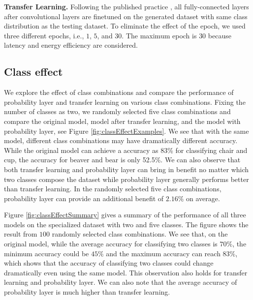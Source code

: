 \documentclass[pageno]{jpaper}
\begin{document}
\textbf{Transfer Learning.} Following the published practice \cite{doersch2015unsupervised, han2016mcdnn, oquab2014learning, shen2016fast, yosinski2014transferable}, all fully-connected layers after convolutional layers are finetuned on the generated dataset with same class distribution as the testing dataset. To eliminate the effect of the epoch, we used three different epochs, i.e., $1$, $5$, and $30$. The maximum epoch is $30$ because latency and energy efficiency are considered.

\subsection{Class effect}
We explore the effect of class combinations and compare the performance of probability layer and transfer learning on various class combinations. Fixing the number of classes as two, we randomly selected five class combinations and compare the original model, model after transfer learning, and the model with probability layer, see Figure \ref{fig:classEffectExamples}. We see that with the same model, different class combinations may have dramatically different accuracy. While the original model can achieve a accuracy as 83\% for classifying chair and cup, the accuracy for beaver and bear is only 52.5\%. We can also observe that both transfer learning and probability layer can bring in benefit no matter which two classes compose the dataset while probability layer generally performs better than transfer learning. In the randomly selected five class combinations, probability layer can provide an additional benefit of $2.16\%$ on average.

Figure \ref{fig:classEffectSummary} gives a summary of the performance of all three models on the specialized dataset with two and five classes. The figure shows the result from $100$ randomly selected class combinations. We see that, on the original model, while the average accuracy for classifying two classes is $70\%$, the minimum accuracy could be $45\%$ and the maximum accuracy can reach $83\%$, which shows that the accuracy of classifying two classes could change dramatically even using the same model. This observation also holds for transfer learning and probability layer. We can also note that the average accuracy of probability layer is much higher than transfer learning. 
\end{document}

